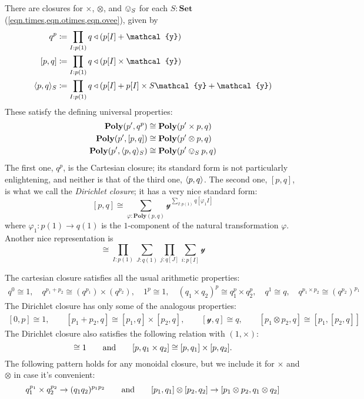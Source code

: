 \documentclass[11pt, one side, article]{memoir}
\theoremstyle{definition}
\theoremstyle{plain}
\DeclarePairedDelimiter{\present}{\langle}{\rangle}
\newcommand{\Cat}[1]{\mathbf{#1}}%
\newcommand{\tn}[1]{\textnormal{#1}}
\newcommand{\smset}{\Cat{Set}}
\newcommand{\yon}{{\mathcal{y}}}
\newcommand{\poly}{\Cat{Poly}}
\newcommand{\0}{\textsf{0}}
\newcommand{\1}{\tn{\textsf{1}}}
\newcommand{\tri}{\mathbin{\triangleleft}}
\newcommand{\hh}[2][]{#1 \tn{#2} #1}
\newcommand{\qqand}{\hh[\qquad]{and}}
\begin{document}
There are closures for $\times$, $\otimes$, and $\ovee_S$ for each $S:\smset$ (\cref{eqn.times,eqn.otimes,eqn.ovee}),%
given by
\begin{align}
  q^p&\coloneqq \prod_{I: p(1)}q\tri(p[I]+\yon)\label{eqn.cart_cl}\\
  [p,q]&\coloneqq\prod_{I: p(1)}q\tri(p[I]\times\yon)\\
  \present{p,q}_S&\coloneqq\prod_{I: p(1)}q\tri(p[I]+p[I]\times S\yon+\yon)
\end{align}
These satisfy the defining universal properties:
\begin{align}
  \poly(p',q^p)&\cong\poly(p'\times p,q)\\
  \poly(p',[p,q])&\cong\poly(p'\otimes p,q)\\
  \poly(p',\present{p,q}_S)&\cong\poly(p'\ovee_S p,q)
\end{align}
The first one, $q^p$, is the Cartesian closure; its standard form is not particularly enlightening, and neither is that of the third one, $\present{p,q}$. The second one, $[p,q]$, is what we call the \emph{Dirichlet closure}; it has a very nice standard form:
\[
[p,q]\cong\sum_{\varphi:\poly(p,q)}\yon^{\sum\limits_{I: p(1)}q[\varphi_1I]}
\]
where $\varphi_1\colon p(1)\to q(1)$ is the $1$-component of the natural transformation $\varphi$. Another nice representation is
\begin{equation}
[p,q]\cong\prod_{I: p(1)}\sum_{J: q(1)}\prod_{j: q[J]}\sum_{i: p[I]}\yon
\end{equation}

The cartesian closure satisfies all the usual arithmetic properties:
\begin{gather}\label{eqn.timeshom_properties}
	q^0\cong1,\quad
	q^{p_1+p_2}\cong (q^{p_1})\times(q^{p_2}),\quad
	1^p\cong 1,\quad
	(q_1\times q_2)^p\cong q_1^p\times q_2^p,\quad
	q^1\cong q,\quad
	q^{p_1\times p_2}\cong (q^{p_2})^{p_1}
\end{gather}
The Dirichlet closure has only some of the analogous properties:
\begin{gather}\label{eqn.dirhom_properties}
	[0,p]\cong1,\qquad
	[p_1+p_2,q]\cong [p_1,q]\times[p_2,q],\qquad
	[\yon,q]\cong q,\qquad
	[p_1\otimes p_2,q]\cong[p_1,[p_2,q]]
\end{gather}
The Dirichlet closure also satisfies the following relation with $(1,\times)$:
\begin{equation}
  [p,1]\cong 1
  \qqand
  [p,q_1\times q_2]\cong[p,q_1]\times[p,q_2].
\end{equation}
The following pattern holds for any monoidal closure, but we include it for $\times$ and $\otimes$ in case it's convenient:
\begin{equation}
	q_1^{p_1}\times q_2^{p_2}\to (q_1q_2)^{p_1p_2}
	\qqand
	[p_1,q_1]\otimes[p_2,q_2]\to[p_1\otimes p_2,q_1\otimes q_2]
\end{equation}
\end{document}
